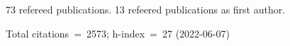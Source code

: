 73 refereed publications. 13 refeered publications as first author.

Total citations~=~2573; h-index~=~27 (2022-06-07)